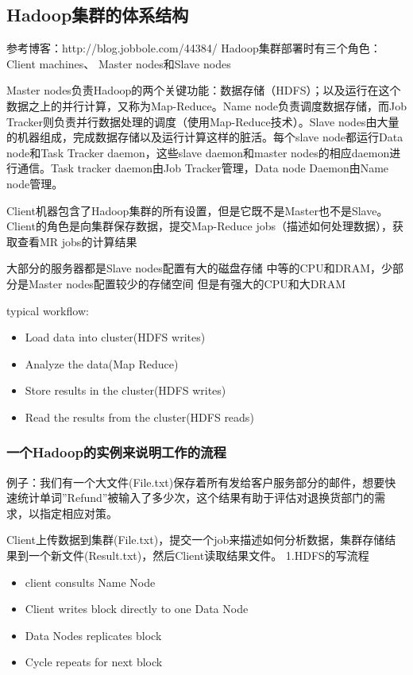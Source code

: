 \subsection{Hadoop集群的体系结构}
参考博客：http://blog.jobbole.com/44384/
Hadoop集群部署时有三个角色：Client machines、 Master nodes和Slave nodes

Master nodes负责Hadoop的两个关键功能：数据存储（HDFS）；以及运行在这个数据之上的并行计算，又称为Map-Reduce。Name node负责调度数据存储，而Job Tracker则负责并行数据处理的调度（使用Map-Reduce技术）。Slave nodes由大量的机器组成，完成数据存储以及运行计算这样的脏活。每个slave node都运行Data node和Task Tracker daemon，这些slave daemon和master nodes的相应daemon进行通信。Task tracker daemon由Job Tracker管理，Data node Daemon由Name node管理。

Client机器包含了Hadoop集群的所有设置，但是它既不是Master也不是Slave。Client的角色是向集群保存数据，提交Map-Reduce jobs（描述如何处理数据），获取查看MR jobs的计算结果

大部分的服务器都是Slave nodes配置有大的磁盘存储 中等的CPU和DRAM，少部分是Master nodes配置较少的存储空间 但是有强大的CPU和大DRAM

typical workflow:
\begin{itemize}
  \item Load data into cluster(HDFS writes)
  \item Analyze the data(Map Reduce)
  \item Store results in the cluster(HDFS writes)
  \item Read the results from the cluster(HDFS reads)
\end{itemize}

\subsubsection{一个Hadoop的实例来说明工作的流程}
例子：我们有一个大文件(File.txt)保存着所有发给客户服务部分的邮件，想要快速统计单词”Refund”被输入了多少次，这个结果有助于评估对退换货部门的需求，以指定相应对策。

Client上传数据到集群(File.txt)，提交一个job来描述如何分析数据，集群存储结果到一个新文件(Result.txt)，然后Client读取结果文件。
1.HDFS的写流程
\begin{itemize}
  \item client consults Name Node
  \item Client writes block directly to one Data Node
  \item Data Nodes replicates block
  \item Cycle repeats for next block
\end{itemize}

